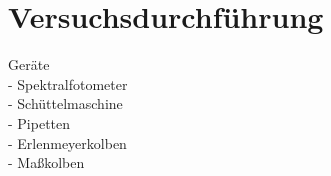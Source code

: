 \newpage
\section{Versuchsdurchführung}
\label{sec:durchfuerung}
Geräte\\
- Spektralfotometer\\
- Schüttelmaschine\\
- Pipetten\\
- Erlenmeyerkolben\\
- Maßkolben\\